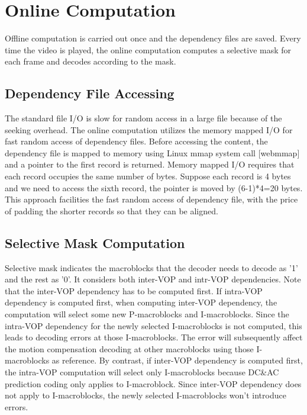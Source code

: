 \section{Online Computation}
Offline computation is carried out once and the dependency files are saved. Every time the video is played, the online computation computes a selective mask for each frame and decodes according to the mask.

\subsection{Dependency File Accessing}
The standard file I/O is slow for random access in a large file because of the seeking overhead. The online computation utilizes the memory mapped I/O for fast random access of dependency files. 
Before accessing the content, the dependency file is mapped to memory using Linux mmap system call [webmmap] and a pointer to the first record is returned. Memory mapped I/O requires that each record occupies the same number of bytes. Suppose each record is 4 bytes and we need to access the sixth record, the pointer is moved by (6-1)*4=20 bytes. This approach facilities the fast random access of dependency file, with the price of padding the shorter records so that they can be aligned. 

\subsection{Selective Mask Computation}
Selective mask indicates the macroblocks that the decoder needs to decode as '1' and the rest as '0'. It considers both inter-VOP and intr-VOP dependencies. Note that the inter-VOP dependency has to be computed first. 
If intra-VOP dependency is computed first, when computing inter-VOP dependency, the computation will select some new P-macroblocks and I-macroblocks. Since the intra-VOP dependency for the newly selected I-macroblocks is not computed, this leads to decoding errors at those I-macroblocks. The error will subsequently affect the motion compensation decoding at other macroblocks using those I-macroblocks as reference. By contrast, if inter-VOP dependency is computed first, the intra-VOP computation will select only I-macroblocks because DC\&AC prediction coding only applies to I-macroblock. Since inter-VOP dependency does not apply to I-macroblocks, the newly selected I-macroblocks won't introduce errors. 

